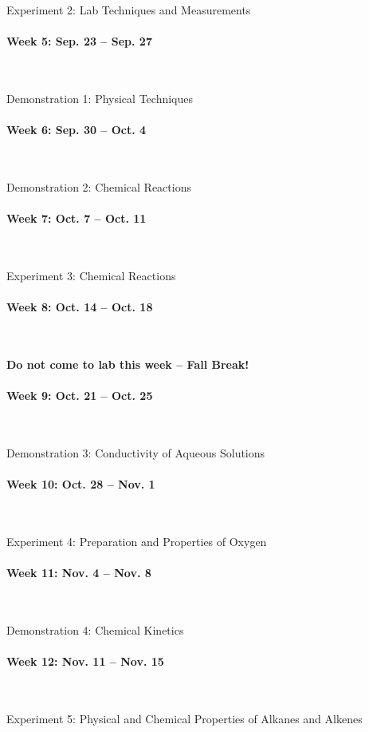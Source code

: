 \documentclass[12pt, letterpaper]{article}
\begin{document}
Experiment 2: Lab Techniques and Measurements

\paragraph{Week 5: Sep. 23 -- Sep. 27}~

Demonstration 1: Physical Techniques

\paragraph{Week 6: Sep. 30 -- Oct. 4}~

Demonstration 2: Chemical Reactions

\paragraph{Week 7: Oct. 7 -- Oct. 11}~

Experiment 3: Chemical Reactions

\paragraph{Week 8: Oct. 14 -- Oct. 18}~

\textbf{Do not come to lab this week -- Fall Break!}

\paragraph{Week 9: Oct. 21 -- Oct. 25}~

Demonstration 3: Conductivity of Aqueous Solutions

\paragraph{Week 10: Oct. 28 -- Nov. 1}~

Experiment 4: Preparation and Properties of Oxygen

\paragraph{Week 11: Nov. 4 -- Nov. 8}~

Demonstration 4: Chemical Kinetics

\paragraph{Week 12: Nov. 11 -- Nov. 15}~

Experiment 5: Physical and Chemical Properties of Alkanes and Alkenes
\end{document}
